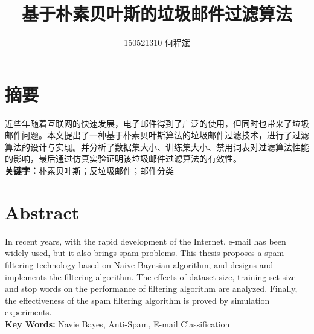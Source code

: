 \documentclass[UTF8,zihao=-4]{ctexart}
\title{基于朴素贝叶斯的垃圾邮件过滤算法}
\author{150521310 何程斌}
\date{}
\begin{document}


\section*{摘要}

  \linespread{1.25}\songti{}
   近些年随着互联网的快速发展，电子邮件得到了广泛的使用，但同时也带来了垃圾邮件问题。本文提出了一种基于朴素贝叶斯算法的垃圾邮件过滤技术，进行了过滤算法的设计与实现。并分析了数据集大小、训练集大小、禁用词表对过滤算法性能的影响，最后通过仿真实验证明该垃圾邮件过滤算法的有效性。
   \\

  {\noindent\heiti{}\textbf{关键字：}朴素贝叶斯；反垃圾邮件；邮件分类}
\newpage

\section*{Abstract}

  \linespread{1.25}
	In recent years, with the rapid development of the Internet, e-mail has been widely used, but it also brings spam problems. This thesis proposes a spam filtering technology based on Naive Bayesian algorithm, and designs and implements the filtering algorithm. The effects of dataset size, training set size and stop words on the performance of filtering algorithm are analyzed. Finally, the effectiveness of the spam filtering algorithm is proved by simulation experiments.
	\\

  \noindent{}\textbf{Key Words: }Navie Bayes, Anti-Spam, E-mail Classification
\newpage
\end{document}
